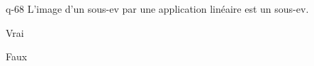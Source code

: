 \begin{truefalse}{q-68}
L'image d'un sous-ev par une application linéaire est un sous-ev.
\item* Vrai
\item Faux
\end{truefalse}

